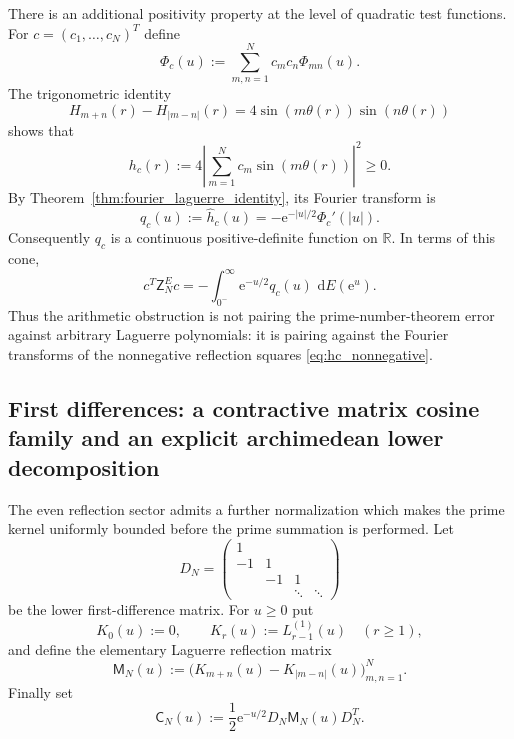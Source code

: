 \documentclass[11pt]{amsart}
\numberwithin{equation}{section}
\theoremstyle{plain}
\theoremstyle{definition}
\theoremstyle{remark}
\newcommand{\e}{\mathrm e}
\newcommand{\dd}{\,\mathrm d}
\begin{document}
There is an additional positivity property at the level of quadratic test functions.  For $c=(c_1,\dots,c_N)^T$ define
\begin{equation}
 \Phi_c(u):=\sum_{m,n=1}^Nc_mc_n\Phi_{mn}(u).
 \label{eq:Phi_c_definition}
\end{equation}
The trigonometric identity
\begin{equation}
 H_{m+n}(r)-H_{|m-n|}(r)
 =4\sin(m\theta(r))\sin(n\theta(r))
 \label{eq:H_reflection_square_identity}
\end{equation}
shows that
\begin{equation}
 h_c(r):=
 4\left|\sum_{m=1}^Nc_m\sin(m\theta(r))\right|^2\ge0.
 \label{eq:hc_nonnegative}
\end{equation}
By Theorem~\ref{thm:fourier_laguerre_identity}, its Fourier transform is
\begin{equation}
 q_c(u):=\widehat h_c(u)
 =-\e^{-|u|/2}\Phi_c'(|u|).
 \label{eq:qc_fourier_phi}
\end{equation}
Consequently $q_c$ is a continuous positive-definite function on $\mathbb R$.  In terms of this cone,
\begin{equation}
 \boxed{
 c^T\mathsf Z_N^Ec
 =-\int_{0^-}^{\infty}
 \e^{-u/2}q_c(u)\,\dd E(\e^u).}
 \label{eq:prime_quadratic_positive_definite_cone}
\end{equation}
Thus the arithmetic obstruction is not pairing the prime-number-theorem error against arbitrary Laguerre polynomials: it is pairing against the Fourier transforms of the nonnegative reflection squares \eqref{eq:hc_nonnegative}.

\subsection{First differences: a contractive matrix cosine family and an explicit archimedean lower decomposition}
\label{subsec:first_difference_prime_arch}

The even reflection sector admits a further normalization which makes the prime kernel uniformly bounded before the prime summation is performed.  Let
\begin{equation}
 D_N=
 \begin{pmatrix}
 1&&&\\
 -1&1&&\\
 &-1&1&\\
 &&\ddots&\ddots
 \end{pmatrix}
 \label{eq:DN_prime_arch}
\end{equation}
be the lower first-difference matrix.  For $u\ge0$ put
\begin{equation}
 K_0(u):=0,
 \qquad
 K_r(u):=L_{r-1}^{(1)}(u)\quad(r\ge1),
 \label{eq:Kr_prime_arch}
\end{equation}
and define the elementary Laguerre reflection matrix
\begin{equation}
 \mathsf M_N(u)
 :=\bigl(K_{m+n}(u)-K_{|m-n|}(u)\bigr)_{m,n=1}^N.
 \label{eq:MN_prime_arch}
\end{equation}
Finally set
\begin{equation}
 \mathsf C_N(u)
 :=\frac12\e^{-u/2}D_N\mathsf M_N(u)D_N^T.
 \label{eq:CN_prime_arch}
\end{equation}
\end{document}
